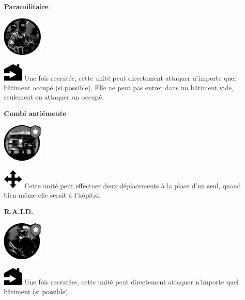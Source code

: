 \documentclass[a4paper,13pt]{scrartcl}
\begin{document}
\begin{minipage}[c]{0.2\textwidth}
	\centering
	\textbf{Paramilitaire}
	\smallskip
	
	\includegraphics[width=2cm]{special_units-paramilitar.png}
\end{minipage}\hfill
\begin{minipage}[c]{0.75\textwidth}
	\includegraphics[width=1cm]{direct_enter.png} Une fois recrutée, cette unité peut directement attaquer n'importe quel bâtiment occupé (si possible). Elle ne peut pas entrer dans un bâtiment vide, seulement en attaquer un occupé.
\end{minipage}
\bigskip

\begin{minipage}[c]{0.2\textwidth}
	\centering
	\textbf{Combi antiémeute}
	\smallskip
	
	\includegraphics[width=2cm]{special_units-van.png}
\end{minipage}\hfill
\begin{minipage}[c]{0.75\textwidth}
	\includegraphics[width=1cm]{movement.png} Cette unité peut effectuer deux déplacements à la place d'un seul, quand bien même elle serait à l'hôpital.
\end{minipage}
\bigskip

\begin{minipage}[c]{0.2\textwidth}
	\centering
	\textbf{R.A.I.D.}
	\smallskip
	
	\includegraphics[width=2cm]{special_units-swat.png}
\end{minipage}\hfill
\begin{minipage}[c]{0.75\textwidth}
	\includegraphics[width=1cm]{direct_enter.png} Une fois recrutées, cette unité peut directement attaquer n'importe quel bâtiment (si possible).
\end{minipage}
\end{document}
